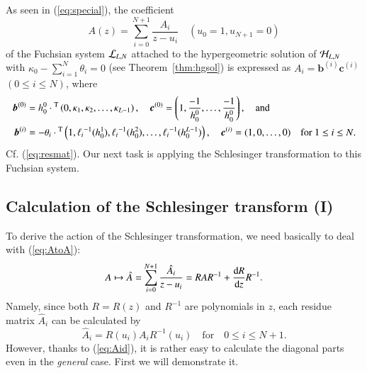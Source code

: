 \documentclass[12pt]{article}
\numberwithin{equation}{section}
\begin{document}
As seen in (\ref{eq:special}),
the coefficient 
\[
A(z)=\sum_{i=0}^{N+1} \frac{A_i}{z-u_i}
\quad 
(u_0=1, u_{N+1}=0)
\]
of
 the Fuchsian system ${\cal L}_{L,N}$ 
attached to the hypergeometric solution 
of ${\cal H}_{L,N}$
with $\kappa_0-\sum_{i=1}^N \theta_i=0$
(see Theorem~\ref{thm:hgsol})
is expressed as
$A_i= {\boldsymbol b}^{(i)} {\boldsymbol  c}^{(i)}$ $(0 \leq i\leq N)$,
where
\begin{align}
{\boldsymbol b}^{(0)} &=
h^0_0 \cdot
{}^{\rm T}
\left(0, \kappa_1,\kappa_2 ,
 \ldots, \kappa_{L-1} 
\right),
\quad
 {\boldsymbol c}^{(0)} =\left( 1, \frac{-1}{h^0_0}, \ldots, \frac{-1}{h^0_0} \right),
 \quad \text{and}
   \nonumber
 \\
 {\boldsymbol b}^{(i)} &=
- \theta_i 
 \cdot
 {}^{\rm T}
 \left(  1, {\ell_i}^{-1} (h_0^1),
 {\ell_i}^{-1} (h_0^2), 
 \ldots, 
  {\ell_i}^{-1} (h_0^{L-1})
 \right),
 \quad
  {\boldsymbol c}^{(i)} =( 1, 0, \ldots, 0 )
  \quad \text{for $1 \leq i \leq N$.}
   \label{eq:bchg}
\end{align}
Cf. (\ref{eq:resmat}).
Our next task is 
applying
the Schlesinger transformation to 
this Fuchsian system.



\subsection{Calculation of the Schlesinger transform (I)}
\label{subsect:cal1}


To derive the action of the Schlesinger transformation,
we need basically to deal with
(\ref{eq:AtoA}): 
\[
A
\mapsto \hat{A}
=
\sum_{i=0}^{N+1}
\frac{\hat{A}_i}{z-u_i}
=
R A R^{-1} + \frac{{\rm d} R}{{\rm d}z}R^{-1}.
\]
Namely, 
since
both $R=R(z)$ and $R^{-1}$ are polynomials in $z$,
each residue matrix 
$\hat{A}_i$
can be 
calculated by
\begin{equation}
\label{eq:hatai}
\hat{A}_i=
R(u_i) A_i R^{-1}(u_i)
\quad \text{for}
\quad 
0 \leq i \leq N+1.
\end{equation}
However,
thanks to (\ref{eq:Aid}),
it is rather easy to calculate the diagonal parts
even in the {\it general} case.
First we will demonstrate it.
\end{document}
